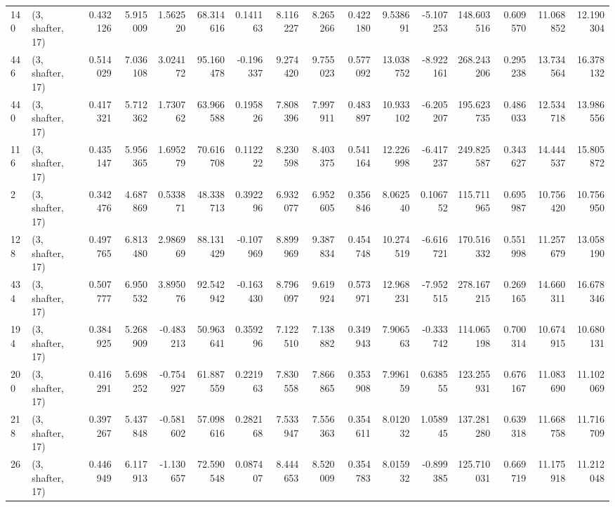 \begin{tabular}{llrrrrrrrrrrrrrr}
140 &  (3, shafter, 17) &   0.432126 &   5.915009 &   1.562520 &    68.314616 &   0.141163 &   8.116227 &   8.265266 &  0.422180 &   9.538691 &  -5.107253 &   148.603516 &  0.609570 &  11.068852 &  12.190304 \\
446 &  (3, shafter, 17) &   0.514029 &   7.036108 &   3.024172 &    95.160478 &  -0.196337 &   9.274420 &   9.755023 &  0.577092 &  13.038752 &  -8.922161 &   268.243206 &  0.295238 &  13.734564 &  16.378132 \\
440 &  (3, shafter, 17) &   0.417321 &   5.712362 &   1.730762 &    63.966588 &   0.195826 &   7.808396 &   7.997911 &  0.483897 &  10.933102 &  -6.205207 &   195.623735 &  0.486033 &  12.534718 &  13.986556 \\
116 &  (3, shafter, 17) &   0.435147 &   5.956365 &   1.695279 &    70.616708 &   0.112222 &   8.230598 &   8.403375 &  0.541164 &  12.226998 &  -6.417237 &   249.825587 &  0.343627 &  14.444537 &  15.805872 \\
2   &  (3, shafter, 17) &   0.342476 &   4.687869 &   0.533871 &    48.338713 &   0.392296 &   6.932077 &   6.952605 &  0.356846 &   8.062540 &   0.106752 &   115.711965 &  0.695987 &  10.756420 &  10.756950 \\
128 &  (3, shafter, 17) &   0.497765 &   6.813480 &   2.986969 &    88.131429 &  -0.107969 &   8.899969 &   9.387834 &  0.454748 &  10.274519 &  -6.616721 &   170.516332 &  0.551998 &  11.257679 &  13.058190 \\
434 &  (3, shafter, 17) &   0.507777 &   6.950532 &   3.895076 &    92.542942 &  -0.163430 &   8.796097 &   9.619924 &  0.573971 &  12.968231 &  -7.952515 &   278.167215 &  0.269165 &  14.660311 &  16.678346 \\
194 &  (3, shafter, 17) &   0.384925 &   5.268909 &  -0.483213 &    50.963641 &   0.359296 &   7.122510 &   7.138882 &  0.349943 &   7.906563 &  -0.333742 &   114.065198 &  0.700314 &  10.674915 &  10.680131 \\
200 &  (3, shafter, 17) &   0.416291 &   5.698252 &  -0.754927 &    61.887559 &   0.221963 &   7.830558 &   7.866865 &  0.353908 &   7.996159 &   0.638555 &   123.255931 &  0.676167 &  11.083690 &  11.102069 \\
218 &  (3, shafter, 17) &   0.397267 &   5.437848 &  -0.581602 &    57.098616 &   0.282168 &   7.533947 &   7.556363 &  0.354611 &   8.012032 &   1.058945 &   137.281280 &  0.639318 &  11.668758 &  11.716709 \\
26  &  (3, shafter, 17) &   0.446949 &   6.117913 &  -1.130657 &    72.590548 &   0.087407 &   8.444653 &   8.520009 &  0.354783 &   8.015932 &  -0.899385 &   125.710031 &  0.669719 &  11.175918 &  11.212048 \\

\end{tabular}

